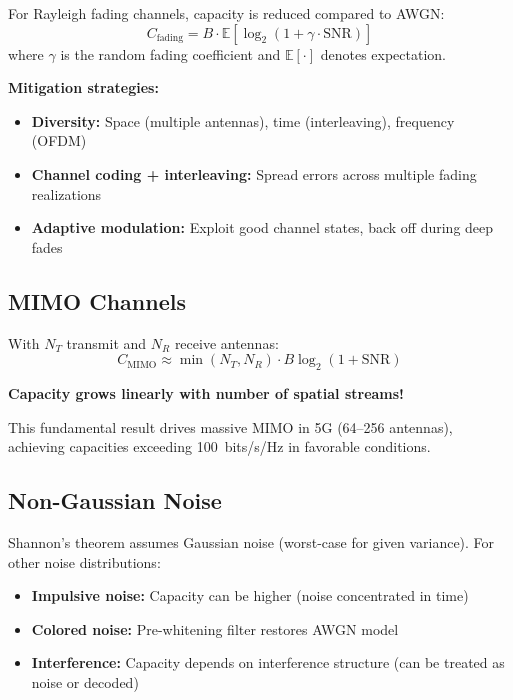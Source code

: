 For Rayleigh fading channels, capacity is reduced compared to AWGN:
\begin{equation}
C_{\text{fading}} = B \cdot \mathbb{E}\left[\log_2(1 + \gamma \cdot \mathrm{SNR})\right]
\end{equation}
where $\gamma$ is the random fading coefficient and $\mathbb{E}[\cdot]$ denotes expectation.

\textbf{Mitigation strategies:}
\begin{itemize}
\item \textbf{Diversity:} Space (multiple antennas), time (interleaving), frequency (OFDM)
\item \textbf{Channel coding + interleaving:} Spread errors across multiple fading realizations
\item \textbf{Adaptive modulation:} Exploit good channel states, back off during deep fades
\end{itemize}

\subsection{MIMO Channels}

With $N_T$ transmit and $N_R$ receive antennas:
\begin{equation}
C_{\text{MIMO}} \approx \min(N_T, N_R) \cdot B \log_2(1 + \mathrm{SNR})
\end{equation}

\textbf{Capacity grows linearly with number of spatial streams!}

This fundamental result drives massive MIMO in 5G (64--256 antennas), achieving capacities exceeding 100~bits/s/Hz in favorable conditions.

\subsection{Non-Gaussian Noise}

Shannon's theorem assumes Gaussian noise (worst-case for given variance). For other noise distributions:
\begin{itemize}
\item \textbf{Impulsive noise:} Capacity can be higher (noise concentrated in time)
\item \textbf{Colored noise:} Pre-whitening filter restores AWGN model
\item \textbf{Interference:} Capacity depends on interference structure (can be treated as noise or decoded)
\end{itemize}


